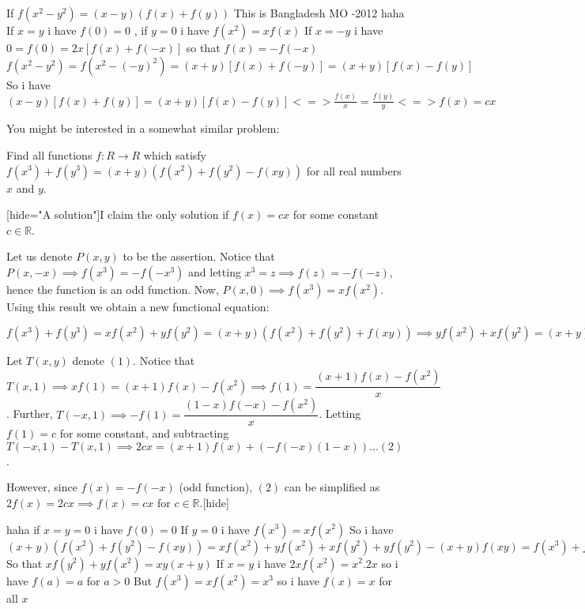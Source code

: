 \begin{solution}
	If $f(x^{2}-y^{2})=(x-y)(f(x)+f(y))$
This is Bangladesh MO -2012 haha 
If $x=y$ i have $f(0)=0$ , if $y=0$ i have $f(x^{2})=xf(x)$ 
If $x=-y$ i have $0=f(0)=2x[f(x)+f(-x)]$ so that $f(x)=-f(-x)$ 
$f(x^{2}-y^{2})=f(x^{2}-(-y)^{2})=(x+y)[f(x)+f(-y)]=(x+y)[f(x)-f(y)]$
So i have $(x-y)[f(x)+f(y)]=(x+y)[f(x)-f(y)]<=>\frac{f(x)}{x}=\frac{f(y)}{y}<=>f(x)=cx$
\end{solution}



\begin{solution}
	You might be interested in a somewhat similar problem:

Find all functions $f : R \to R$ which satisfy $f(x^3) + f(y^3) = (x + y)(f(x^2) + f(y^2) - f(xy))$ for all real numbers $x$ and $y$.

[hide="A solution"]I claim the only solution if $f(x) = cx$ for some constant $c \in \mathbb{R}$.

Let us denote $P(x, y)$ to be the assertion. Notice that $P(x, -x) \implies f(x^3) = -f(-x^3)$ and letting $x^3 = z \implies f(z) = -f(-z)$, hence the function is an odd function. Now, $P(x, 0) \implies f(x^3) = xf(x^2)$. Using this result we obtain a new functional equation:

$f(x^3) + f(y^3) = xf(x^2) + yf(y^2) = (x+y)(f(x^2) + f(y^2) + f(xy)) \implies \boxed{yf(x^2) + xf(y^2) = (x+y)f(xy)...(1)}$

Let $T(x, y)$ denote $(1)$. Notice that $T(x, 1) \implies xf(1) = (x+1)f(x) - f(x^2) \implies f(1) = \dfrac{(x+1)f(x) - f(x^2)}{x}$.
Further, $T(-x, 1) \implies -f(1) = \dfrac{(1-x)f(-x) - f(x^2)}{x}$. Letting $f(1) = c$ for some constant, and subtracting $T(-x, 1) - T(x, 1) \implies \boxed{2cx = (x+1)f(x) + (-f(-x)(1-x))...(2)}$.

However, since $f(x) = -f(-x)$ (odd function), $(2)$ can be simplified as $2f(x) = 2cx \implies f(x) = cx$ for $c \in \mathbb{R}$.[\/hide]
\end{solution}



\begin{solution}
	 haha if $x=y=0$ i have $f(0)=0$ 
If $y=0$ i have $f(x^{3})=xf(x^{2})$
So i have $(x+y)(f(x^{2})+f(y^{2})-f(xy))=xf(x^{2})+yf(x^{2})+xf(y^{2})+yf(y^{2})-(x+y)f(xy)=f(x^{3})+f(y^{3})$ 
So that $xf(y^{2})+yf(x^{2})=xy(x+y)$ 
If $x=y$ i have $2xf(x^{2})=x^{2}.2x$ so i have $f(a)=a$ for $a>0$
But $f(x^{3})=xf(x^{2})=x^{3}$ so i have $f(x)=x$ for all $x$
\end{solution}



